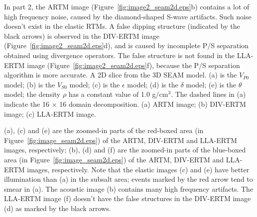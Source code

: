 \documentclass[manuscript,ulem,graphix,revised]{geophysics}
\begin{document}
In part 2, the ARTM image (Figure~\ref{fig:image2_seam2d.eps}b) contains a lot of high frequency noise, caused by the diamond-shaped S-wave artifacts. Such noise doesn't exist in the elastic RTMs. 
A false dipping structure (indicated by the black arrows) is observed in the DIV-ERTM image (Figure~\ref{fig:image2_seam2d.eps}d), and is caused by incomplete P/S separation obtained using divergence operators. 
The false structure is not found in the LLA-ERTM image (Figure~\ref{fig:image2_seam2d.eps}f), because the P/S separation algorithm is more accurate.
{
A 2D slice from the 3D SEAM model. 
(a) is the $V_{P0}$ model; 
(b) is the $V_{S0}$ model; 
(c) is the $\epsilon$ model; 
(d) is the $\delta$ model; 
(e) is the $\theta$ model; the density $\rho$ has a constant value of 1.0 g/cm$^3$. The dashed lines in (a) indicate the 16 $\times$ 16 domain decomposition.
}
{
(a) ARTM image; (b) DIV-ERTM image; (c) LLA-ERTM image. 
}

{
\small{
(a), (c) and (e) are the zoomed-in parts of the red-boxed area (in Figure~\ref{fig:image_seam2d.eps}) of the ARTM, DIV-ERTM and LLA-ERTM images, respectively; 
(b), (d) and (f) are the zoomed-in parts of the blue-boxed area (in Figure~\ref{fig:image_seam2d.eps}) of the ARTM, DIV-ERTM and LLA-ERTM images, respectively.
Note that the elastic images (c) and (e) have better illumination than (a) in the subsalt area; events marked by the red arrow tend to smear in (a).
The acoustic image (b) contains many high frequency artifacts. The LLA-ERTM image (f) doesn't have the false structures in the DIV-ERTM image (d) as marked by the black arrows.}
}

\end{document}
